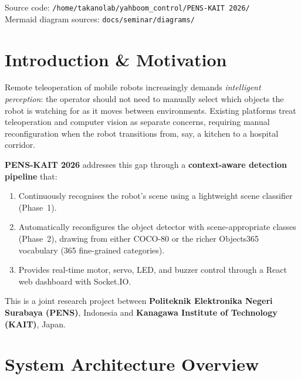 \documentclass[12pt,a4paper]{article}
\begin{document}
\begin{titlepage}
  \vfill
  \small\color{dark!60}
  Source code: \texttt{/home/takanolab/yahboom\_control/PENS-KAIT~2026/}\\
  Mermaid diagram sources: \texttt{docs/seminar/diagrams/}
\end{titlepage}

\tableofcontents
\newpage

\section{Introduction \& Motivation}

Remote teleoperation of mobile robots increasingly demands \textit{intelligent
perception}: the operator should not need to manually select which objects the
robot is watching for as it moves between environments. Existing platforms
treat teleoperation and computer vision as separate concerns, requiring manual
reconfiguration when the robot transitions from, say, a kitchen to a hospital
corridor.

\textbf{PENS-KAIT 2026} addresses this gap through a \textbf{context-aware
detection pipeline} that:
\begin{enumerate}[leftmargin=*]
  \item Continuously recognises the robot's scene using a lightweight scene
        classifier (Phase~1).
  \item Automatically reconfigures the object detector with scene-appropriate
        classes (Phase~2), drawing from either COCO-80 or the richer
        Objects365 vocabulary (365 fine-grained categories).
  \item Provides real-time motor, servo, LED, and buzzer control through a
        React web dashboard with Socket.IO.
\end{enumerate}

\begin{infobox}
This is a joint research project between
\textbf{Politeknik Elektronika Negeri Surabaya (PENS)}, Indonesia and
\textbf{Kanagawa Institute of Technology (KAIT)}, Japan.
\end{infobox}

\section{System Architecture Overview}
\end{document}
